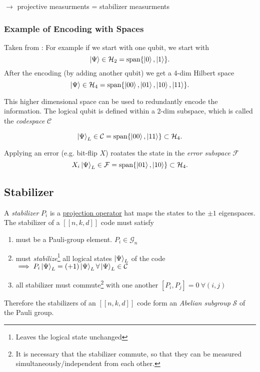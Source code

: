 $\rightarrow$ projective measurments = stabilizer measurments

\subsubsection{Example of Encoding with Spaces}
Taken from \cite{QECintro}: 
For example if we start with one qubit, we start with 
\begin{equation}
    \ket{\Psi} \in \mathcal{H}_2 = \text{span}\{\ket{0},\ket{1} \}.
\end{equation}
After the encoding (by adding another qubit) we get a 4-dim Hilbert space 
\begin{equation}
    \ket{\Psi} \in \mathcal{H}_4 = \text{span}\{\ket{00},\ket{01},\ket{10},\ket{11} \}.
\end{equation}

This higher dimensional space can be used to redundantly encode the information.
The logical qubit is defined within a 2-dim subspace, which is called the \textit{codespace} $\mathcal{C}$

\begin{equation}
    \ket{\Psi}_L \in \mathcal{C} = \text{span}\{\ket{00},\ket{11} \} \subset \mathcal{H}_4.
\end{equation}

Applying an error (e.g. bit-flip $X$) roatates the state in the \textit{error subspace} $\mathcal{F}$
\begin{equation}
    X_i \ket{\Psi}_L \in \mathcal{F} = \text{span}\{\ket{01},\ket{10} \} \subset \mathcal{H}_4.
\end{equation} 


\subsection{Stabilizer}\label{sec:basic.qc.stabilizer}

A \textit{stabilizer} 
$P_i$ is a 
\hyperref[sec:basic.math.projection_operator]{projection operator} 
hat maps the states to the $\pm 1$ eigenspaces. 
The stabilizer of a $[[n,k,d]]$ code must satisfy
\begin{enumerate}
    \item must be a Pauli-group element. $P_i \in \mathcal{G}_n$ 
    \item must \textit{stabilize}\footnote{Leaves the logical state unchanged} all logical states $\ket{\Psi}_L$ of the code \\
    $\implies P_i \ket{\Psi}_L = (+1) \ket{\Psi}_L \forall \ket{\Psi}_L \in \mathcal{C} $ 
    \item all stabilizer must commute\footnote{
It is necessary that the stabilizer commute, so that they can be measured simultaneously/independent from each other. 
    } with one another $[P_i,P_j]=0 \ \forall (i,j)$
\end{enumerate}
Therefore the stabilizers of an $[[n,k,d]]$ code form an \textit{Abelian subgroup} $\mathcal{S}$ of the Pauli group. \cite{QECintro}

